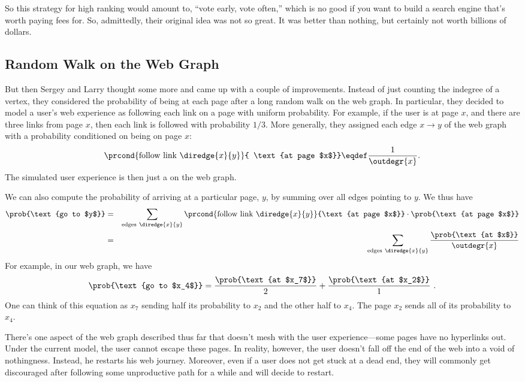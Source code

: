 So this strategy for high ranking would amount to, ``vote early, vote
often,'' which is no good if you want to build a search engine that's
worth paying fees for.  So, admittedly, their original idea was not so
great.  It was better than nothing, but certainly not worth billions of
dollars.

\subsection{Random Walk on the Web Graph}

But then Sergey and Larry thought some more and came up with a couple
of improvements.  Instead of just counting the indegree of a vertex,
they considered the probability of being at each page after a long
random walk on the web graph.  In particular, they decided to model a
user's web experience as following each link on a page with uniform
probability.  For example, if the user is at page $x$, and there are
three links from page $x$, then each link is followed with probability
$1/3$.  More generally, they assigned each edge $x \rightarrow y$ of
the web graph with a probability conditioned on being on page $x$:
\[
\prcond{\text{follow link}\ \diredge{x}{y}}{ \text{at page $x$}} \eqdef
\frac{1}{\outdegr{x}}.
\]
The simulated user experience is then just a  on the
web graph.

We can also compute the probability of arriving at a particular page, $y$,
by summing over all edges pointing to $y$.  We thus have
\begin{eqnarray}
  \prob{\text{go to $y$}} &=&  \sum_{\text{edges}\ \diredge{x}{y}}
  \prcond{\text{follow link}\ \diredge{x}{y}}{\text{at page $x$}} \cdot
  \prob{\text{at page $x$}} \nonumber\\
  &=& \sum_{\text{edges}\ \diredge{x}{y}} \frac{\prob{\text{at
      $x$}}}{\outdegr{x}} \label{LN12:stepprob}
\end{eqnarray}
For example, in our web graph, we have
\[ \prob{\text{go to $x_4$}} = \frac{\prob{\text{at $x_7$}}}{2} +
\frac{\prob{\text{at $x_2$}}}{1} \ .
\]
One can think of this equation as $x_7$ sending half its probability
to $x_2$ and the other half to $x_4$.  The page $x_2$ sends all of its
probability to $x_4$.

There's one aspect of the web graph described thus far that doesn't
mesh with the user experience---some pages have no hyperlinks out.
Under the current model, the user cannot escape these pages.  In
reality, however, the user doesn't fall off the end of the web into a
void of nothingness.  Instead, he restarts his web journey.  Moreover,
even if a user does not get stuck at a dead end, they will commonly get
discouraged after following some unproductive path for a while and
will decide to restart.

